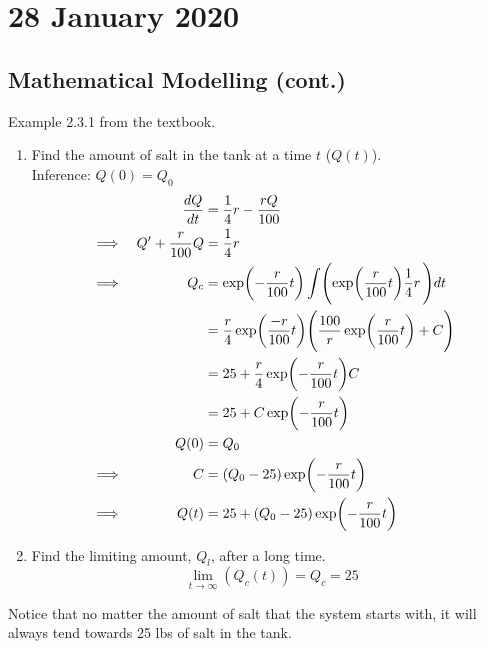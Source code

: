 \documentclass[twoside]{report}
\begin{document}
    \chapter{28 January 2020}
    \section{Mathematical Modelling (cont.)}
    \begin{example}
        Example 2.3.1 from the textbook.
        \begin{enumerate}
            \item Find the amount of salt in the tank at a time $t$ ($Q(t)$).\\
            Inference: $Q(0) = Q_{0}$
            \begin{alignat}{3}
                &&\frac{dQ}{dt}&=\frac{1}{4}r - \frac{rQ}{100}\\
                &\implies&Q' + \frac{r}{100}Q&=\frac{1}{4}r\\
                &\implies&Q_{c}&=\exp\bbbp{-\frac{r}{100}t}\int\BBp{\exp\bbbp{\frac{r}{100}t}\frac{1}{4}r\,}dt\\
                &&&=\frac{r}{4}\exp\bbbp{\frac{-r}{100}t}\BBp{\frac{100}{r}\exp\bbbp{\frac{r}{100}t}+C}\\
                &&&=25 + \frac{r}{4}\exp\bbbp{-\frac{r}{100}t}C\\
                &&&=25 + C\exp\bbbp{-\frac{r}{100}t}\\
                &&Q(0)&=Q_{0}\\
                &\implies&C&=(Q_{0} - 25)\exp\bbbp{-\frac{r}{100}t}\\
                &\implies&Q(t)&=25 + (Q_{0} - 25)\exp\bbbp{-\frac{r}{100}t}
            \end{alignat}
            \item Find the limiting amount, $Q_{l}$, after a long time.
            \begin{equation}
                \lim_{t\to\infty}(Q_{c}(t)) = Q_{c} = 25
            \end{equation}
        \end{enumerate}
    \end{example}
    \begin{remark}
        Notice that no matter the amount of salt that the system starts with, it will always tend towards 25 lbs of salt in the tank.
    \end{remark}
\end{document}
